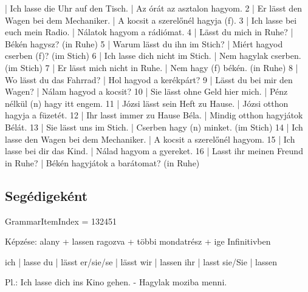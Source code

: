 \documentclass{article}
\newenvironment{desc}{\verbatim}{\endverbatim}
\newenvironment{exmp}{\verbatim}{\endverbatim}
\begin{document}
\begin{exmp}
1 | Ich lasse die Uhr auf den Tisch. | Az órát az asztalon hagyom.
2 | Er lässt den Wagen bei dem Mechaniker. | A kocsit a szerelőnél hagyja (f).
3 | Ich lasse bei euch mein Radio. | Nálatok hagyom a rádiómat.
4 | Lässt du mich in Ruhe? | Békén hagysz? (in Ruhe)
5 | Warum lässt du ihn im Stich? | Miért hagyod cserben (f)? (im Stich)
6 | Ich lasse dich nicht im Stich. | Nem hagylak cserben. (im Stich)
7 | Er lässt mich nicht in Ruhe. | Nem hagy (f) békén. (in Ruhe)
8 | Wo lässt du das Fahrrad? | Hol hagyod a kerékpárt?
9 | Lässt du bei mir den Wagen? | Nálam hagyod a kocsit?
10 | Sie lässt ohne Geld hier mich. | Pénz nélkül (n) hagy itt engem.
11 | Józsi lässt sein Heft zu Hause. | Józsi otthon hagyja a füzetét.
12 | Ihr lasst immer zu Hause Béla. | Mindig otthon hagyjátok Bélát.
13 | Sie lässt uns im Stich. | Cserben hagy (n) minket. (im Stich)
14 | Ich lasse den Wagen bei dem Mechaniker. | A kocsit a szerelőnél hagyom.
15 | Ich lasse bei dir das Kind. | Nálad hagyom a gyereket.
16 | Lasst ihr meinen Freund in Ruhe? | Békén hagyjátok a barátomat? (in Ruhe)
\end{exmp}

\subsection{Segédigeként}

GrammarItemIndex = 132451

\begin{desc}
Képzése:
alany + lassen ragozva + többi mondatrész + ige Infinitivben

ich       | lasse
du        | lässt
er/sie/se | lässt
wir       | lassen
ihr       | lasst
sie/Sie   | lassen

Pl.: Ich lasse dich ins Kino gehen. - Hagylak moziba menni.
\end{desc}
\end{document}
